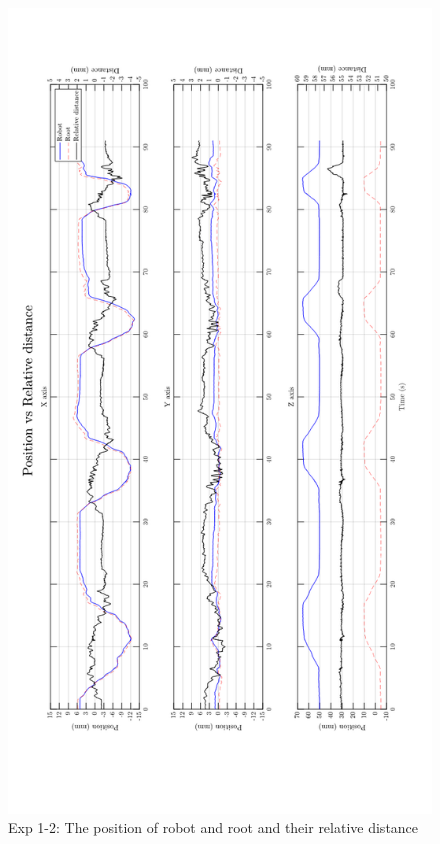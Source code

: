 \begin{figure}[htbp]
\begin{center}
\includegraphics[width=1\linewidth]{Images/exp/exp1_2_1.png}
\caption{Exp 1-2: The position of robot and root and their relative distance}
\label{fig: exp1_2_1}
\end{center}
\end{figure}	
